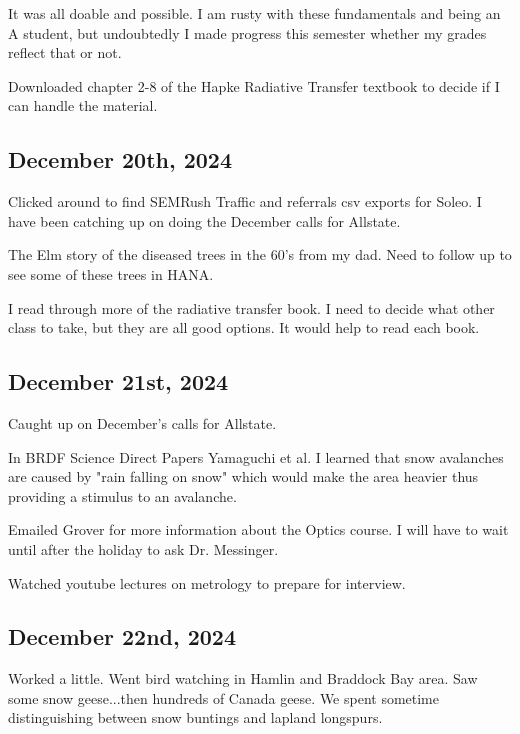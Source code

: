 \documentclass{article}
\begin{document}
It was all doable and possible. I am rusty with these fundamentals and being an A student, but undoubtedly I made progress this semester whether my grades reflect that or not. 

Downloaded chapter 2-8 of the Hapke Radiative Transfer textbook to decide if I can handle the material. 

\subsection{December 20th, 2024}
Clicked around to find SEMRush Traffic and referrals csv exports for Soleo. I have been catching up on doing the December calls for Allstate. 

The Elm story of the diseased trees in the 60's from my dad. Need to follow up to see some of these trees in HANA. 

I read through more of the radiative transfer book. I need to decide what other class to take, but they are all good options. It would help to read each book. 


\subsection{December 21st, 2024}

Caught up on December's calls for Allstate. 

In BRDF Science Direct Papers Yamaguchi et al. I learned that snow avalanches are caused by "rain falling on snow" which would make the area heavier thus providing a stimulus to an avalanche. 

Emailed Grover for more information about the Optics course. I will have to wait until after the holiday to ask Dr. Messinger. 


Watched youtube lectures on metrology to prepare for interview. 


\subsection{December 22nd, 2024}
Worked a little. Went bird watching in Hamlin and Braddock Bay area. Saw some snow geese...then hundreds of Canada geese. We spent sometime distinguishing between snow buntings and lapland longspurs. 
\end{document}
